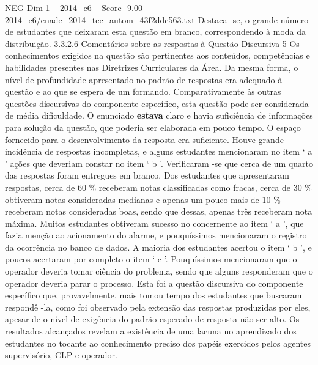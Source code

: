 \begin{textsample}{NEG Dim 1 – 2014\_c6 – Score -9.00 – 2014\_c6/enade\_2014\_tec\_autom\_43f2ddc563.txt}
Destaca -se, o grande número de estudantes que deixaram esta questão em branco, correspondendo à moda da distribuição. 3.3.2.6 Comentários sobre as respostas à Questão Discursiva 5 Os conhecimentos exigidos na questão são pertinentes aos conteúdos, competências e habilidades presentes nas Diretrizes Curriculares da Área.
Da mesma forma, o nível de profundidade apresentado no padrão de respostas era adequado à questão e ao que se espera de um formando.
Comparativamente às outras questões discursivas do componente específico, esta questão pode ser considerada de média dificuldade.
O enunciado \textbf{estava} claro e havia suficiência de informações para solução da questão, que poderia ser elaborada em pouco tempo.
O espaço fornecido para o desenvolvimento da resposta era suficiente.
Houve grande incidência de respostas incompletas, e alguns estudantes mencionaram no item ‘ a ’ ações que deveriam constar no item ‘ b ’.
Verificaram -se que cerca de um quarto das respostas foram entregues em branco.
Dos estudantes que apresentaram respostas, cerca de 60 \% receberam notas classificadas como fracas, cerca de 30 \% obtiveram notas consideradas medianas e apenas um pouco mais de 10 \% receberam notas consideradas boas, sendo que dessas, apenas três receberam nota máxima.
Muitos estudantes obtiveram sucesso no concernente ao item ‘ a ’, que fazia menção ao acionamento do alarme, e pouquíssimos mencionaram o registro da ocorrência no banco de dados.
A maioria dos estudantes acertou o item ‘ b ’, e poucos acertaram por completo o item ‘ c ’.
Pouquíssimos mencionaram que o operador deveria tomar ciência do problema, sendo que alguns responderam que o operador deveria parar o processo.
Esta foi a questão discursiva do componente específico que, provavelmente, mais tomou tempo dos estudantes que buscaram respondê -la, como foi observado pela extensão das respostas produzidas por eles, apesar de o nível de exigência do padrão esperado de resposta não ser alto.
Os resultados alcançados revelam a existência de uma lacuna no aprendizado dos estudantes no tocante ao conhecimento preciso dos papéis exercidos pelos agentes supervisório, CLP e operador.

\end{textsample}
